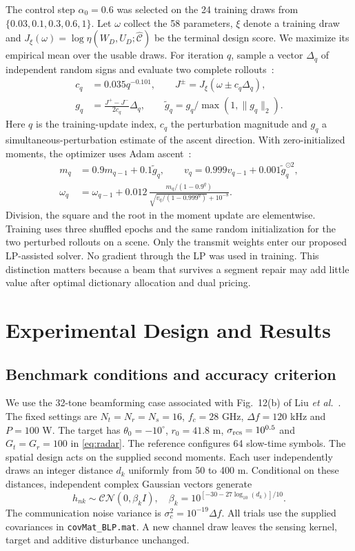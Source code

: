 \documentclass[journal]{IEEEtran}
\newcommand{\norm}[1]{\lVert #1\rVert}
\begin{document}
The control step $\alpha_0=0.6$ was selected on the 24 training draws from $\{0.03,0.1,0.3,0.6,1\}$. Let $\omega$ collect the 58 parameters, $\xi$ denote a training draw and $J_\xi(\omega)=\log\eta(W_D,U_D;\widehat{\mathcal C})$ be the terminal design score. We maximize its empirical mean over the usable draws. For iteration $q$, sample a vector $\Delta_q$ of independent random signs and evaluate two complete rollouts~\cite{spall}:
\begin{align}
 c_q&=0.035q^{-0.101},\qquad J^\pm=J_\xi(\omega\pm c_q\Delta_q),\\
 g_q&=\frac{J^+-J^-}{2c_q}\Delta_q,\qquad
 \tilde g_q=g_q/\max(1,\norm{g_q}_2).
\end{align}
Here $q$ is the training-update index, $c_q$ the perturbation magnitude and $g_q$ a simultaneous-perturbation estimate of the ascent direction. With zero-initialized moments, the optimizer uses Adam ascent~\cite{adam}:
\begin{align}
 m_q&=0.9m_{q-1}+0.1\tilde g_q,\qquad
 v_q=0.999v_{q-1}+0.001\tilde g_q^{\odot2},\\
 \omega_q&=\omega_{q-1}+0.012\,
 \frac{m_q/(1-0.9^q)}{\sqrt{v_q/(1-0.999^q)}+10^{-8}} .
\end{align}
Division, the square and the root in the moment update are elementwise. Training uses three shuffled epochs and the same random initialization for the two perturbed rollouts on a scene. Only the transmit weights enter our proposed LP-assisted solver. No gradient through the LP was used in training. This distinction matters because a beam that survives a segment repair may add little value after optimal dictionary allocation and dual pricing.


\section{Experimental Design and Results}
\subsection{Benchmark conditions and accuracy criterion}
We use the 32-tone beamforming case associated with Fig.~12(b) of Liu \emph{et al.}~\cite{liuCode}. The fixed settings are $N_t=N_r=N_s=16$, $f_c=28$ GHz, $\Delta f=120$ kHz and $P=100$ W. The target has $\theta_0=-10^\circ$, $r_0=41.8$ m, $\sigma_{\rm rcs}=10^{0.5}$ and $G_t=G_r=100$ in \eqref{eq:radar}. The reference configures 64 slow-time symbols. The spatial design acts on the supplied second moments. Each user independently draws an integer distance $d_k$ uniformly from 50 to 400 m. Conditional on these distances, independent complex Gaussian vectors generate
\begin{equation}
 h_{nk}\sim\mathcal{CN}(0,\beta_k I),\quad
 \beta_k=10^{[-30-27\log_{10}(d_k)]/10}.
\end{equation}
The communication noise variance is $\sigma_c^2=10^{-19}\Delta f$. All trials use the supplied covariances in \texttt{covMat\_BLP.mat}. A new channel draw leaves the sensing kernel, target and additive disturbance unchanged.
\end{document}
